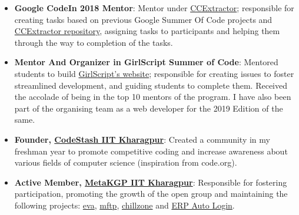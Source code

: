 \documentclass[a4paper,10pt]{extarticle} %
\begin{document}
\begin{itemize}[leftmargin=0.55cm, rightmargin=0.2cm, label={\Large\textbullet}]
\item \textbf{Google CodeIn 2018 Mentor}: Mentor under \href{https://codein.withgoogle.com/organizations/ccextractor-development/}{CCExtractor}; responsible for creating tasks based on previous Google Summer Of Code projects and \href{https://github.com/CCExtractor/ccextractor/}{CCExtractor repository}, assigning tasks to participants and helping them through the way to completion of the tasks.
\item \textbf{Mentor And Organizer in GirlScript Summer of Code}: Mentored students to build \href{https://github.com/GirlScriptSummerOfCode/GirlScript_India}{GirlScript's website}; responsible for creating issues to foster streamlined development, and guiding students to complete them. Received the accolade of being in the top 10 mentors of the program. I have also been part of the organising team as a web developer for the 2019 Edition of the same.
\item \textbf{Founder, \href{https://www.facebook.com/codestashkgp/}{CodeStash IIT Kharagpur}}: Created a community in my freshman year to promote competitive coding and increase awareness about various fields of computer science (inspiration from code.org).
\item \textbf{Active Member, \href{https://wiki.metakgp.org/w/Metakgp:About}{MetaKGP IIT Kharagpur}}: Responsible for fostering participation, promoting the growth of the open group and maintaining the following projects: \href{https://www.github.com/thealphadollar/eva}{eva}, \href{https://github.com/metakgp/mftp}{mftp}, \href{https://github.com/metakgp/chillzone}{chillzone} and \href{https://github.com/metakgp/erp-auto-login}{ERP Auto Login}.
\end{itemize}


\vspace{-0.1cm}
\end{document}
